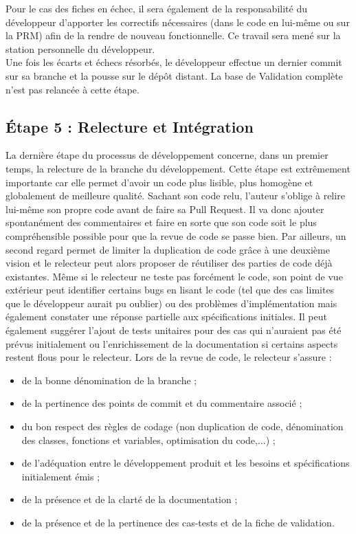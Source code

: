 Pour le cas des fiches en échec, il sera également de la responsabilité du développeur d'apporter les correctifs nécessaires (dans le code en lui-même ou sur la PRM) afin de la rendre de nouveau fonctionnelle. Ce travail sera mené sur la station personnelle du développeur.\\
Une fois les écarts et échecs résorbés, le développeur effectue un dernier commit sur sa branche et la pousse sur le dépôt distant. La base de Validation complète n'est pas relancée à cette étape.
\subsection{\label{subsec:relecture}Étape 5 : Relecture et Int\'egration}
La dernière étape du processus de développement concerne, dans un premier temps, la relecture de la branche du développement. Cette étape est extrêmement importante car elle permet d'avoir un code plus lisible, plus homogène et globalement de meilleure qualité. Sachant son code relu, l'auteur s'oblige à relire lui-même son propre code avant de faire sa Pull Request. Il va donc ajouter spontanément des commentaires et faire en sorte que son code soit le plus compréhensible possible pour que la revue de code se passe bien. Par ailleurs, un second regard permet de limiter la duplication de code grâce à une deuxième vision et le relecteur peut alors proposer de réutiliser des parties de code déjà existantes. Même si le relecteur ne teste pas forcément le code, son point de vue extérieur peut identifier certains bugs en lisant le code (tel que des cas limites que le développeur aurait pu oublier) ou des problèmes d'implémentation mais également constater une réponse partielle aux spécifications initiales. Il peut également suggérer l'ajout de tests unitaires pour des cas qui n'auraient pas été prévus initialement ou l'enrichissement de la documentation si certains aspects restent flous pour le relecteur.
Lors de la revue de code, le relecteur s'assure : \\
\begin{itemize}
  \item de la bonne dénomination de la branche ;
  \item de la pertinence des points de commit et du commentaire associé ;
  \item du bon respect des règles de codage (non duplication de code, dénomination des classes, fonctions et variables, optimisation du code,...) ;
  \item de l'adéquation entre le développement produit et les besoins et spécifications initialement émis ;
  \item de la présence et de la clarté de la documentation ;
  \item de la présence et de la pertinence des cas-tests et de la fiche de validation.
\end{itemize}
